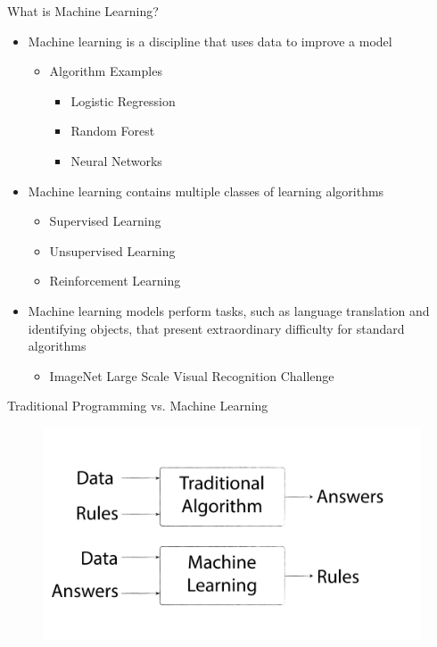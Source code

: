 \documentclass[10pt]{beamer}
\begin{document}
\begin{frame}{What is Machine Learning?}
	\begin{itemize}
		\item Machine learning is a discipline that uses data to improve a model
			\begin{itemize}
				\item Algorithm Examples
					\begin{itemize}
						\item Logistic Regression
						\item Random Forest
						\item Neural Networks
					\end{itemize}
			\end{itemize}
		  \pause
		\item Machine learning contains multiple classes of learning algorithms
			\begin{itemize}
				\item Supervised Learning
				\item Unsupervised Learning
				\item Reinforcement Learning
			\end{itemize}
		  \pause
		\item Machine learning models perform tasks, such as language translation and identifying objects, that present extraordinary difficulty for standard algorithms
			\begin{itemize}
				\item ImageNet Large Scale Visual Recognition Challenge 
			\end{itemize}
		
	\end{itemize}
\end{frame}

\begin{frame}{Traditional Programming vs. Machine Learning}
	\begin{figure}
		\includegraphics[width=1.0\textwidth, center, trim=0cm 0cm 0 0cm]{images/ML_paradigm.pdf}
	\end{figure}
\end{frame}
\end{document}
